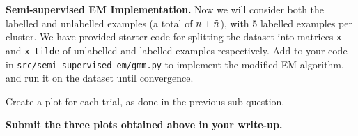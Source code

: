 \item{} \textbf{Semi-supervised EM Implementation.}
Now we will consider both the labelled and unlabelled examples (a total of ${n} + \tilde{{n}}$), with 5 labelled examples per cluster. We have provided starter code for splitting the dataset into matrices \texttt{x} and \texttt{x\_tilde} of unlabelled and labelled examples respectively. Add to your code in \texttt{src/semi\_supervised\_em/gmm.py} to implement the modified EM algorithm, and run it on the dataset until convergence.

Create a plot for each trial, as done in the previous sub-question.

\textbf{Submit the three plots obtained above in your write-up.}

